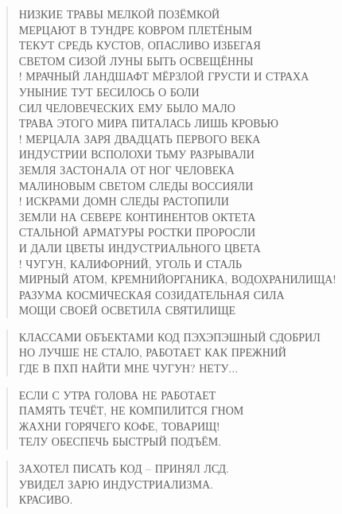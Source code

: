 \poemtitle{***}
\begin{verse}
НИЗКИЕ ТРАВЫ МЕЛКОЙ ПОЗЁМКОЙ \\
МЕРЦАЮТ В ТУНДРЕ КОВРОМ ПЛЕТЁНЫМ\\
ТЕКУТ СРЕДЬ КУСТОВ, ОПАСЛИВО ИЗБЕГАЯ\\
СВЕТОМ СИЗОЙ ЛУНЫ БЫТЬ ОСВЕЩЁННЫ\\!
МРАЧНЫЙ ЛАНДШАФТ МЁРЗЛОЙ ГРУСТИ И СТРАХА\\
УНЫНИЕ ТУТ БЕСИЛОСЬ О БОЛИ\\
СИЛ ЧЕЛОВЕЧЕСКИХ ЕМУ БЫЛО МАЛО\\
ТРАВА ЭТОГО МИРА ПИТАЛАСЬ ЛИШЬ КРОВЬЮ\\!
МЕРЦАЛА ЗАРЯ ДВАДЦАТЬ ПЕРВОГО ВЕКА\\
ИНДУСТРИИ ВСПОЛОХИ ТЬМУ РАЗРЫВАЛИ\\
ЗЕМЛЯ ЗАСТОНАЛА ОТ НОГ ЧЕЛОВЕКА\\
МАЛИНОВЫМ СВЕТОМ СЛЕДЫ ВОССИЯЛИ\\!
ИСКРАМИ ДОМН СЛЕДЫ РАСТОПИЛИ\\
ЗЕМЛИ НА СЕВЕРЕ КОНТИНЕНТОВ ОКТЕТА\\
СТАЛЬНОЙ АРМАТУРЫ РОСТКИ ПРОРОСЛИ\\
И ДАЛИ ЦВЕТЫ ИНДУСТРИАЛЬНОГО ЦВЕТА\\!
ЧУГУН, КАЛИФОРНИЙ, УГОЛЬ И СТАЛЬ\\
МИРНЫЙ АТОМ, КРЕМНИЙОРГАНИКА, ВОДОХРАНИЛИЩА!\\
РАЗУМА КОСМИЧЕСКАЯ СОЗИДАТЕЛЬНАЯ СИЛА\\
МОЩИ СВОЕЙ ОСВЕТИЛА СВЯТИЛИЩЕ
\end{verse}

\poemtitle{***}
\begin{verse}
КЛАССАМИ ОБЪЕКТАМИ КОД ПЭХЭПЭШНЫЙ СДОБРИЛ\\
НО ЛУЧШЕ НЕ СТАЛО, РАБОТАЕТ КАК ПРЕЖНИЙ\\
ГДЕ В ПХП НАЙТИ МНЕ ЧУГУН? НЕТУ...
\end{verse}

\poemtitle{***}
\begin{verse}
ЕСЛИ С УТРА ГОЛОВА НЕ РАБОТАЕТ\\
ПАМЯТЬ ТЕЧЁТ, НЕ КОМПИЛИТСЯ ГНОМ\\
ЖАХНИ ГОРЯЧЕГО КОФЕ, ТОВАРИЩ!\\
ТЕЛУ ОБЕСПЕЧЬ БЫСТРЫЙ ПОДЪЁМ.
\end{verse}

\poemtitle{***}
\begin{verse}
ЗАХОТЕЛ ПИСАТЬ КОД -- ПРИНЯЛ ЛСД.\\
УВИДЕЛ ЗАРЮ ИНДУСТРИАЛИЗМА.\\
КРАСИВО.
\end{verse}

